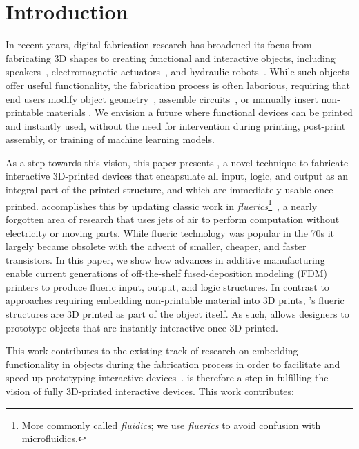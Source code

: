   \section{Introduction}
    In recent years, digital fabrication research has broadened its
    focus from fabricating 3D shapes to creating
    functional and interactive objects, including
    speakers~\cite{Ishiguro:2014}, 
    electromagnetic actuators~\cite{Peng:2016}, and hydraulic
    robots~\cite{MacCurdy:2016}. While such objects offer useful
    functionality, the fabrication process is often laborious,
    requiring that end users modify object
    geometry~\cite{Ledo:2017}, assemble
    circuits~\cite{Murray-Smith:2008}, or 
    manually insert non-printable materials \cite{He:2017}. We
    envision a future where functional devices can be printed and
    instantly used, without the need for intervention during
    printing, post-print assembly, or training of machine learning
    models.

    As a step towards this vision, this paper presents \al, a novel
    technique to fabricate interactive 3D-printed devices that
    encapsulate all input, logic, and output as an integral part of
    the printed structure, and which are immediately usable once
    printed. \al accomplishes this by updating classic work in
    \textit{fluerics}\footnote{More commonly called
    \textit{fluidics}; we use \textit{fluerics} to avoid confusion
    with microfluidics.}~\cite{CharlesBelsterling:1971}, a nearly
    forgotten area of research that uses jets of air to perform
    computation without electricity or moving parts. While flueric
    technology was popular in the 70s
    it largely became obsolete with the advent of smaller, cheaper,
    and faster transistors. In this paper, we show how advances in
    additive manufacturing enable current generations of
    off-the-shelf fused-deposition modeling (FDM) printers to
    produce flueric input, output, and logic structures. In contrast
    to approaches requiring embedding non-printable material into 3D
    prints, \al's flueric structures are 3D printed as part of the
    object itself. As such, \al allows designers to prototype
    objects that are instantly interactive once 3D printed.
    
    This work contributes to the existing track of research on embedding
    functionality in objects during the fabrication process in order to
    facilitate and speed-up prototyping interactive
    devices~\cite{Valkeneers:2019, Ion:2017, Peng:2016}. \al
    is therefore a step in fulfilling the vision of fully 3D-printed
    interactive devices. This work contributes:

